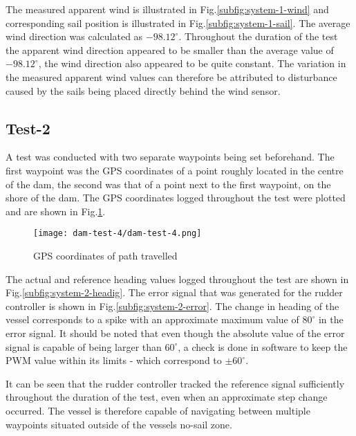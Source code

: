 The measured apparent wind is illustrated in 
Fig.\ref{subfig:system-1-wind} and corresponding sail position is illustrated in Fig.\ref{subfig:system-1-sail}. The average wind direction was calculated as $-98.12^{\circ}$. 
Throughout the duration of the test the apparent wind direction appeared to be 
smaller than the average value of $-98.12^{\circ}$, the wind direction also appeared to be quite constant. The variation in the measured apparent wind values can therefore be attributed to 
disturbance caused by the sails being placed directly behind the wind sensor.  



\subsection{Test-2}
\label{system-test-2}
A test was conducted with two separate waypoints being set beforehand. The first waypoint was the GPS coordinates of a point roughly located in the centre of the dam, the second was that
of a point next to the first waypoint, on the shore of the dam. The GPS coordinates logged throughout the test were plotted and are shown in Fig.\ref{fig:system-test-2-path}.

\begin{figure}[h!]
    \centering
    \texttt{[image: dam-test-4/dam-test-4.png]}
    \caption[Path travelled in second system test]{GPS coordinates of path travelled}
    \label{fig:system-test-2-path}
\end{figure}

The actual and reference heading values logged throughout the test are shown in Fig.\ref{subfig:system-2-headig}. The error signal that was generated for the rudder controller is shown in 
Fig.\ref{subfig:system-2-error}. The change in heading of the vessel corresponds to a spike with an approximate maximum value of $80^{\circ}$ in the error signal. It should be noted that 
even though the absolute value of the error signal is capable of being larger than $60^{\circ}$, a check is done in software to keep the PWM value within its limits - which correspond to 
$\pm 60^{\circ}$. 

It can be seen that the rudder controller tracked the reference signal sufficiently throughout the duration of the test, even when an approximate step change 
occurred. The vessel is therefore capable of navigating between multiple waypoints situated outside of the vessels no-sail zone.

